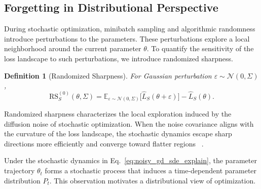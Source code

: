\documentclass{article}
\newtheorem{definition}{Definition}  %
\begin{document}



\subsection{Forgetting in Distributional Perspective}


During stochastic optimization, minibatch sampling and algorithmic randomness introduce perturbations to the parameters. 
These perturbations explore a local neighborhood around the current parameter $\theta$. 
To quantify the sensitivity of the loss landscape to such perturbations, we introduce randomized sharpness.

\begin{definition}[Randomized Sharpness]
For Gaussian perturbation $\varepsilon \sim \mathcal N(0,\Sigma)$,
\begin{equation}
\mathrm{RS}_S^{(0)}(\theta,\Sigma)
=
\mathbb E_{\varepsilon\sim\mathcal N(0,\Sigma)}
\big[
\hat L_S(\theta+\varepsilon)
\big]
-
\hat L_S(\theta).
\end{equation}
\end{definition}

Randomized sharpness characterizes the local exploration induced by the diffusion noise of stochastic optimization. 
When the noise covariance aligns with the curvature of the loss landscape, the stochastic dynamics escape sharp directions more efficiently and converge toward flatter regions ~\cite{zhu2019anisotropicnoisestochasticgradient}.

Under the stochastic dynamics in Eq.~\eqref{eq:noisy_gd_sde_explain}, the parameter trajectory $\theta_t$ forms a stochastic process that induces a time-dependent parameter distribution $P_t$. 
This observation motivates a distributional view of optimization.
\end{document}
